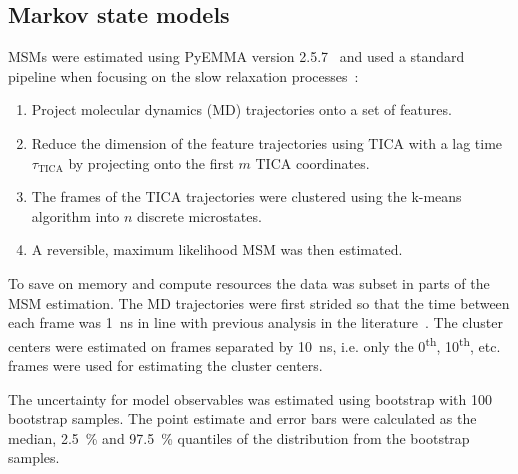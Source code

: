 \documentclass[journal=jacsat,manuscript=article]{achemso}
\begin{document}
\subsection{Markov state models}
MSMs were estimated using PyEMMA version 2.5.7~\cite{schererPyEMMASoftwarePackage2015a} and used a standard pipeline when focusing on the slow relaxation processes~\cite{noe_markov_2019, husic_markov_2018}: 
\begin{enumerate}
    \item Project molecular dynamics (MD) trajectories onto a set of features. 
    \item Reduce the dimension of the feature trajectories using TICA with a lag time $\tau_{\mathrm{TICA}}$ by projecting onto the first $m$ TICA coordinates. 
    \item The frames of the TICA trajectories were clustered using the k-means algorithm into $n$ discrete microstates. 
    \item A reversible, maximum likelihood MSM was then estimated. 
\end{enumerate}
To save on memory and compute resources the data was subset in parts of the MSM estimation. The MD trajectories were first strided so that the time between each frame was \SI{1}{\nano\second} in line with previous analysis in the literature~\cite{sultan_mdstride_2018,beauchamp_mdstride_2013}. The cluster centers were estimated on frames separated by \SI{10} {\nano\second}, i.e. only the 0\textsuperscript{th}, 10\textsuperscript{th}, etc. frames were used for estimating the cluster centers. 

The uncertainty for model observables was estimated using bootstrap with \num{100} bootstrap samples. The point estimate and error bars were calculated as the median,   \SI{2.5}{\percent} and \SI{97.5}{\percent} quantiles of the distribution from the bootstrap samples.
\end{document}
